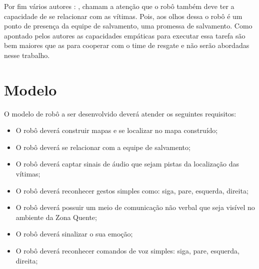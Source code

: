 \documentclass[
	article,			%
	10pt,				%
	oneside,			%
	a4paper,			%
	english,			%
	brazil,				%
	sumario=tradicional	
	]{abntex2}
\begin{document}

Por fim vários autores : \cite{Robin2004}, \cite{akgun2022using} chamam a atenção que o robô também deve ter a capacidade de se relacionar com as vítimas. Pois, aos olhos dessa o robô é um ponto de presença da equipe de salvamento, uma promessa de salvamento. Como apontado pelos autores as capacidades empáticas para executar essa tarefa são bem maiores que as para cooperar com o time de resgate e não serão abordadas nesse trabalho.


\section{Modelo}
O modelo de robô a ser desenvolvido deverá atender os seguintes requisitos:

\begin{itemize}
\item O robô deverá construir mapas e se localizar no mapa construído;
\item O robô deverá se relacionar com a equipe de salvamento;
\item O robô deverá captar sinais de áudio que sejam pistas da localização das vítimas;
\item O robô deverá reconhecer gestos simples como: siga, pare, esquerda, direita;
\item O robô deverá possuir um meio de comunicação não verbal que seja visível no ambiente da Zona Quente;
\item O robô deverá sinalizar o sua emoção;
\item O robô deverá reconhecer comandos de voz simples: siga, pare, esquerda, direita;
\end{itemize}
\end{document}
